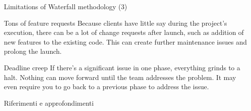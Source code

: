 \documentclass[
    notheorems,
    11pt,
    compress,
    aspectratio=169
]{beamer}
\begin{document}
\begin{frame}{Limitations of Waterfall methodology (3)}
    \begin{block}{Tons of feature requests}
        Because clients have little say during the project’s execution, there can be a lot of change requests after launch, such as addition of new features to the existing code. This can create further maintenance issues and prolong the launch.
    \end{block}

    \pause
    \vfill

    \begin{block}{Deadline creep}
        If there’s a significant issue in one phase, everything grinds to a halt. Nothing can move forward until the team addresses the problem. It may even require you to go back to a previous phase to address the issue.
    \end{block}
\end{frame}


\begin{frame}{Riferimenti e approfondimenti}
    \printbibliography
\end{frame}

\end{document}
